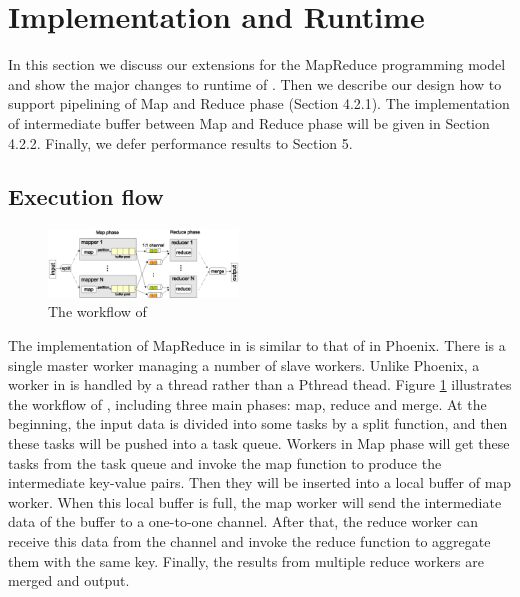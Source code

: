 \section{Implementation and Runtime}
\label{sec:runtime}
In this section we discuss our extensions for the MapReduce programming model and show the major changes to runtime of \myds. 
Then we describe our design how to support pipelining of Map and Reduce phase (Section 4.2.1).
The implementation of intermediate buffer between Map and Reduce phase will be given in Section 4.2.2.
Finally, we defer performance results to Section 5.



\subsection{Execution flow}
\begin{figure}[!h!t]  
    \centering
    \includegraphics[width=0.45\textwidth]{eps/dmr_workflow.eps}
    \caption{The workflow of \myds}
    \label{fig:dmr:workflow}
\end{figure}

The implementation of MapReduce in \myds is similar to that of in Phoenix. 
There is a single master worker managing a number of slave workers. Unlike Phoenix,  a worker in \myds is handled by a \myth thread rather than a Pthread thead.
Figure \ref{fig:dmr:workflow} illustrates the workflow of \myds, including three main phases: map, reduce and merge. 
At the beginning, the input data is divided into some tasks by a split function, and then these tasks will be pushed  into a task queue. 
Workers in Map phase will get these tasks from the task queue and invoke the map function to produce the intermediate key-value pairs.
Then they will be inserted into a local buffer of map worker.
When this local buffer is full, the map worker will send the intermediate data of the buffer to a one-to-one channel.
After that, the reduce worker can receive this data from the channel and invoke the reduce function to aggregate them with the same key.  
Finally, the results from multiple reduce workers are merged and output.

